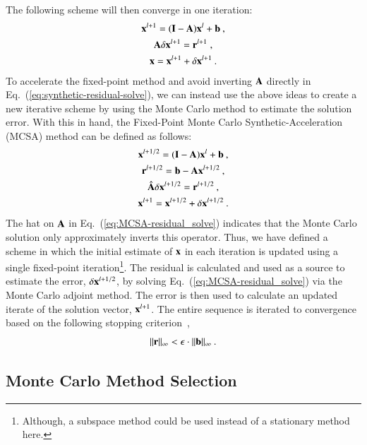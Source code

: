 \documentclass[preprint,12pt]{elsarticle}
\newcommand{\vA}{\ensuremath{\ve{A}}}
\newcommand{\vb}{\ensuremath{\ve{b}}}
\newcommand{\vx}{\ensuremath{\ve{x}}}
\newcommand{\vr}{\ensuremath{\ve{r}}}
\newcommand{\vI}{\ensuremath{\ve{I}}}
\begin{document}
The following scheme will then converge in one iteration:
\begin{subequations}
  \begin{gather}
    \vx^{l+1} = (\vI - \vA)\vx^l + \vb\:,\\ \vA \delta \vx^{l+1} =
    \vr^{l+1}\;,
    \label{eq:synthetic-residual-solve}\\ 
    \vx=\vx^{l+1}+\delta\vx^{l+1}\:.
  \end{gather}
\end{subequations}
To accelerate the fixed-point method and avoid inverting $\vA$ directly in
Eq.~(\ref{eq:synthetic-residual-solve}), we can instead use the above ideas to
create a new iterative scheme by using the Monte Carlo method to estimate the
solution error. With this in hand, the Fixed-Point Monte Carlo
Synthetic-Acceleration (MCSA) method can be defined as follows:
\begin{subequations}
  \label{eq:MCSA-iteration}
  \begin{gather}
    \vx^{l+1/2} = (\vI - \vA)\vx^l + \vb\:,\\  \vr^{l+1/2} = \vb -
    \vA\vx^{l+1/2}\:,
    \label{eq:MCSA-residual}\\     
     \hat{\vA}\delta\vx^{l+1/2} = \vr^{l+1/2}\:,
    \label{eq:MCSA-residual_solve}\\ 
     \vx^{l+1}=\vx^{l+1/2}+\delta\vx^{l+1/2}\:.
  \end{gather}
\end{subequations}
The hat on $\vA$ in Eq.~(\ref{eq:MCSA-residual_solve}) indicates that the
Monte Carlo solution only approximately inverts this operator.  Thus, we have
defined a scheme in which the initial estimate of $\vx$ in each iteration is
updated using a single fixed-point iteration\footnote{Although, a subspace
  method could be used instead of a stationary method here.}.  The residual is
calculated and used as a source to estimate the error, $\delta\vx^{l+1/2}$, by
solving Eq.~(\ref{eq:MCSA-residual_solve}) via the Monte Carlo adjoint
method. The error is then used to calculate an updated iterate of the solution
vector, $\vx^{l+1}$.  The entire sequence is iterated to convergence based on
the following stopping criterion~\cite{kelley_1995},
\begin{equation}
  \|\vr\|_{\infty} < \epsilon\cdot\|\vb\|_\infty\:.
  \label{eq:stopping-criteria}
\end{equation}

\subsection{Monte Carlo Method Selection}
\end{document}
